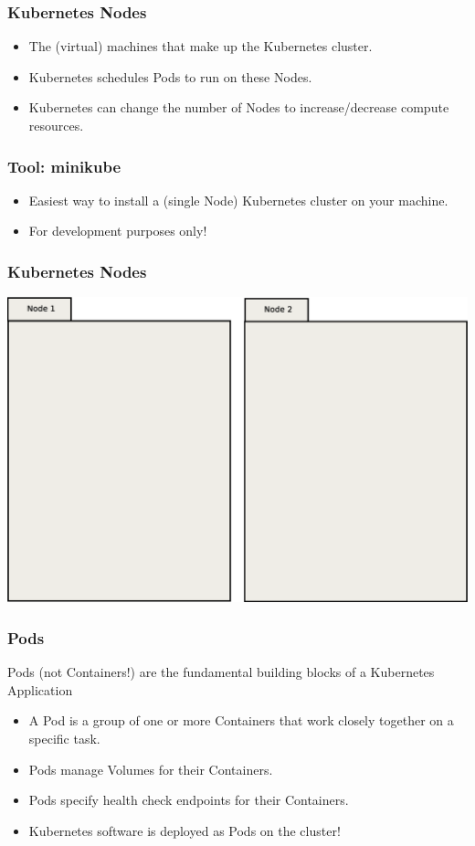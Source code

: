 \documentclass{beamer}
\begin{document}
\begin{frame}
    \frametitle{Kubernetes Nodes}
    \begin{itemize}
        \item The (virtual) machines that make up the Kubernetes cluster.
        \item Kubernetes schedules Pods to run on these Nodes.
        \item Kubernetes can change the number of Nodes to increase/decrease compute resources.
    \end{itemize}
\end{frame}

\begin{frame}
    \frametitle{Tool: minikube\footnotemark}
    \begin{itemize}
        \item Easiest way to install a (single Node) Kubernetes cluster on your machine.
        \item For development purposes only!
    \end{itemize}
\end{frame}

\begin{frame}
    \frametitle{Kubernetes Nodes}
    \includegraphics[width=\textwidth,height=0.85\textheight,keepaspectratio]{graphics/00-nodes.eps}
\end{frame}

\begin{frame}
    \frametitle{Pods}
    Pods (not Containers!) are the fundamental building blocks of a Kubernetes Application
    \begin{itemize}
        \item A Pod is a group of one or more Containers that work closely together on a specific task.
        \item Pods manage Volumes for their Containers.
        \item Pods specify health check endpoints for their Containers.
        \item Kubernetes software is deployed as Pods on the cluster!
    \end{itemize}
\end{frame}
\end{document}
